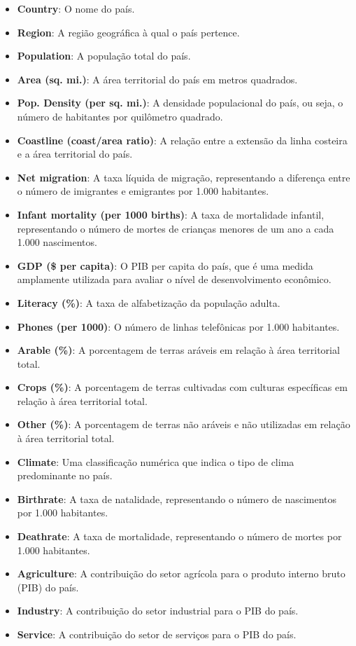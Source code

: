 \documentclass[conference]{IEEEtran}
\begin{document}
\begin{itemize}
  \item \textbf{Country}: O nome do país.
  \item \textbf{Region}: A região geográfica à qual o país pertence.
  \item \textbf{Population}: A população total do país.
  \item \textbf{Area (sq. mi.)}: A área territorial do país em metros quadrados.
  \item \textbf{Pop. Density (per sq. mi.)}: A densidade populacional do país, ou seja, o número de habitantes por quilômetro quadrado.
  \item \textbf{Coastline (coast/area ratio)}: A relação entre a extensão da linha costeira e a área territorial do país.
  \item \textbf{Net migration}: A taxa líquida de migração, representando a diferença entre o número de imigrantes e emigrantes por 1.000 habitantes.
  \item \textbf{Infant mortality (per 1000 births)}: A taxa de mortalidade infantil, representando o número de mortes de crianças menores de um ano a cada 1.000 nascimentos.
  \item \textbf{GDP (\$ per capita)}: O PIB per capita do país, que é uma medida amplamente utilizada para avaliar o nível de desenvolvimento econômico.
  \item \textbf{Literacy (\%)}: A taxa de alfabetização da população adulta.
  \item \textbf{Phones (per 1000)}: O número de linhas telefônicas por 1.000 habitantes.
  \item \textbf{Arable (\%)}: A porcentagem de terras aráveis em relação à área territorial total.
  \item \textbf{Crops (\%)}: A porcentagem de terras cultivadas com culturas específicas em relação à área territorial total.
  \item \textbf{Other (\%)}: A porcentagem de terras não aráveis e não utilizadas em relação à área territorial total.
  \item \textbf{Climate}: Uma classificação numérica que indica o tipo de clima predominante no país.
  \item \textbf{Birthrate}: A taxa de natalidade, representando o número de nascimentos por 1.000 habitantes.
  \item \textbf{Deathrate}: A taxa de mortalidade, representando o número de mortes por 1.000 habitantes.
  \item \textbf{Agriculture}: A contribuição do setor agrícola para o produto interno bruto (PIB) do país.
  \item \textbf{Industry}: A contribuição do setor industrial para o PIB do país.
  \item \textbf{Service}: A contribuição do setor de serviços para o PIB do país.
\end{itemize}
\end{document}
